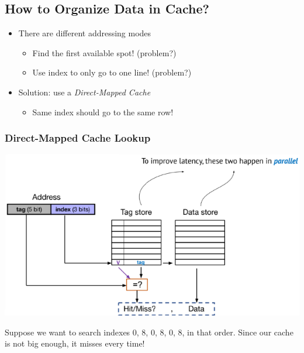 \documentclass[10pt]{article}
\begin{document}
\subsection*{How to Organize Data in Cache?}
\begin{itemize}
    \item There are different addressing modes
    \begin{itemize}
        \item Find the first available spot! (problem?)
        \item Use index to only go to one line! (problem?)
    \end{itemize}
    \item Solution: use a \textit{Direct-Mapped Cache}
    \begin{itemize}
        \item Same index should go to the same row!
    \end{itemize}
\end{itemize}
\subsubsection*{Direct-Mapped Cache Lookup}
\begin{center}
    \includegraphics*[scale=0.8]{W6_9.png}
\end{center}
Suppose we want to search indexes 0, 8, 0, 8, 0, 8, in that order.  Since our cache is not big enough, it misses every time!
\end{document}
